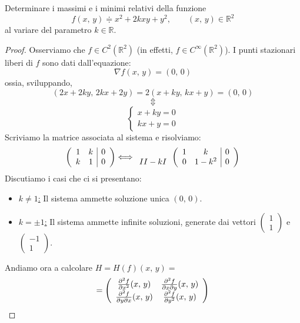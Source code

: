\begin{exer}[Ex. 5, Foglio 5]
Determinare i massimi e i minimi relativi della funzione
$$
f(x,\,y) \doteqdot x^2 + 2kxy + y^2, \qquad (x,\,y) \in \mathbb{R}^2
$$
al variare del parametro $k \in \mathbb{R}$.
\end{exer}
\begin{proof}
Osserviamo che $f \in C^2(\mathbb{R}^2)$ (in effetti, $f \in C^{\infty}(\mathbb{R}^2)$). I punti stazionari liberi di $f$ sono dati dall'equazione:
$$
\nabla f(x,\,y) = (0,\,0)
$$
ossia, sviluppando,
$$
(2x + 2ky ,\, 2kx + 2y) = 2(x + ky ,\, kx + y) = (0,\,0)
$$
$$
\Updownarrow
$$
$$
\begin{cases}
x+ky=0\\
kx+y=0
\end{cases}
$$
Scriviamo la matrice associata al sistema e risolviamo:
$$
\left(
\begin{array}{cc|c}
1 & k & 0\\
k & 1 & 0
\end{array}
\right)
\Longleftrightarrow
\begin{array}{c}
\\
\RNum{2} - k\RNum{1}
\end{array}
\left(
\begin{array}{cc|c}
1 & k & 0\\
0 & 1-k^2 & 0
\end{array}
\right)
$$
Discutiamo i casi che ci si presentano:
\begin{itemize}
\item \underline{$k \neq 1$:} Il sistema ammette soluzione unica $(0,\,0)$.
\item \underline{$k = \pm 1$:} Il sistema ammette infinite soluzioni, generate dai vettori $\left( \begin{array}{c}
1\\1
\end{array} \right)$
e
$\left( \begin{array}{c}
-1\\1
\end{array} \right)$.
\end{itemize}
Andiamo ora a calcolare $H = H(f)(x,\,y) =$
$$
=
\left(
\begin{array}{cc}
\frac{\partial^2 f}{\partial x^2} (x,\,y) & \frac{\partial^2 f}{\partial x \partial y} (x,\,y)\\
\frac{\partial^2 f}{\partial y \partial x} (x,\,y) & \frac{\partial^2 f}{\partial y^2} (x,\,y)
\displaystyle 
\end{array}
\right)
$$
\end{proof}
